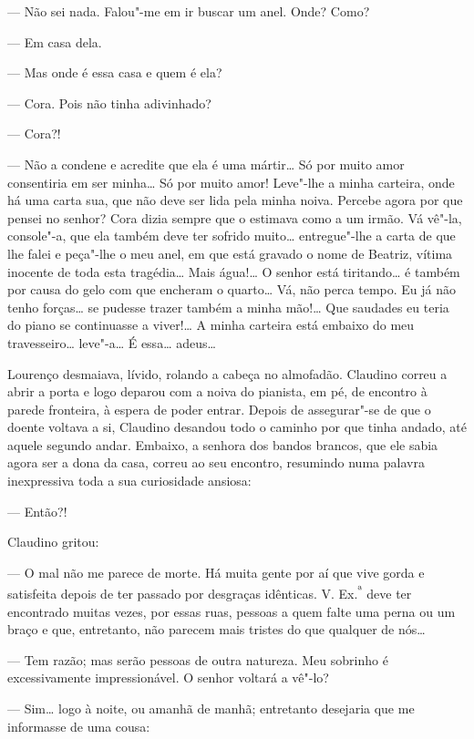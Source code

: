 --- Não sei nada. Falou"-me em ir buscar um anel. Onde? Como?

--- Em casa dela.

--- Mas onde é essa casa e quem é ela?

--- Cora. Pois não tinha adivinhado?

--- Cora?!

--- Não a condene e acredite que ela é uma mártir\ldots{} Só por muito amor
consentiria em ser minha\ldots{} Só por muito amor! Leve"-lhe a minha
carteira, onde há uma carta sua, que não deve ser lida pela minha noiva.
Percebe agora por que pensei no senhor? Cora dizia sempre que o estimava
como a um irmão. Vá vê"-la, console"-a, que ela também deve ter sofrido
muito\ldots{} entregue"-lhe a carta de que lhe falei e peça"-lhe o meu anel, em
que está gravado o nome de Beatriz, vítima inocente de toda esta
tragédia\ldots{} Mais água!\ldots{} O senhor está tiritando\ldots{} é também por causa
do gelo com que encheram o quarto\ldots{} Vá, não perca tempo. Eu já não
tenho forças\ldots{} se pudesse trazer também a minha mão!\ldots{} Que saudades eu
teria do piano se continuasse a viver!\ldots{} A minha carteira está embaixo
do meu travesseiro\ldots{} leve"-a\ldots{} É essa\ldots{} adeus\ldots{}

Lourenço desmaiava, lívido, rolando a cabeça no almofadão. Claudino
correu a abrir a porta e logo deparou com a noiva do pianista, em pé, de
encontro à parede fronteira, à espera de poder entrar. Depois de
assegurar"-se de que o doente voltava a si, Claudino desandou todo o
caminho por que tinha andado, até aquele segundo andar. Embaixo, a
senhora dos bandos brancos, que ele sabia agora ser a dona da casa,
correu ao seu encontro, resumindo numa palavra inexpressiva toda a sua
curiosidade ansiosa:

--- Então?!

Claudino gritou:

--- O mal não me parece de morte. Há muita gente por aí que vive gorda e
satisfeita depois de ter passado por desgraças idênticas. V.
Ex.\textsuperscript{ª} deve ter encontrado muitas vezes, por essas ruas,
pessoas a quem falte uma perna ou um braço e que, entretanto, não
parecem mais tristes do que qualquer de nós\ldots{}

--- Tem razão; mas serão pessoas de outra natureza. Meu sobrinho é
excessivamente impressionável. O senhor voltará a vê"-lo?

--- Sim\ldots{} logo à noite, ou amanhã de manhã; entretanto desejaria que me
informasse de uma cousa:

